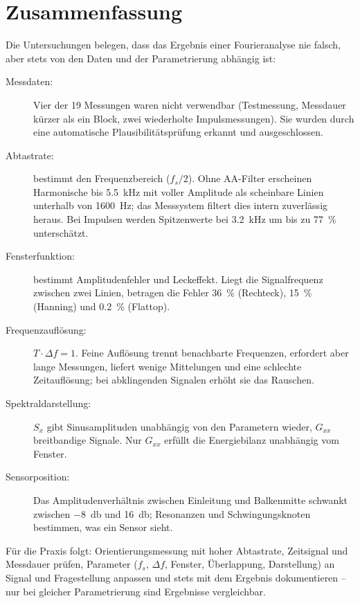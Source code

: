 \documentclass[a4paper,11pt,parskip=half,toc=listof,bibliography=totoc]{scrartcl}
\newcommand{\Sx}{S_{x}}
\newcommand{\Gxx}{G_{xx}}
\begin{document}
\section{Zusammenfassung}
Die Untersuchungen belegen, dass das Ergebnis einer Fourieranalyse nie
\glqq falsch\grqq, aber stets von den Daten und der Parametrierung abhängig
ist:
\begin{description}
  \item[Messdaten:] Vier der 19 Messungen waren nicht verwendbar (Testmessung,
    Messdauer kürzer als ein Block, zwei wiederholte Impulsmessungen). Sie
    wurden durch eine automatische Plausibilitätsprüfung erkannt und
    ausgeschlossen.
  \item[Abtastrate:] bestimmt den Frequenzbereich ($f_s/2$). Ohne
    AA-Filter erscheinen Harmonische bis \SI{5.5}{\kilo\hertz} mit voller
    Amplitude als scheinbare Linien unterhalb von \SI{1600}{\hertz}; das
    Messsystem filtert dies intern zuverlässig heraus. Bei Impulsen werden
    Spitzenwerte bei \SI{3.2}{\kilo\hertz} um bis zu \SI{77}{\percent}
    unterschätzt.
  \item[Fensterfunktion:] bestimmt Amplitudenfehler und Leckeffekt. Liegt die
    Signalfrequenz zwischen zwei Linien, betragen die Fehler
    \SI{36}{\percent} (Rechteck), \SI{15}{\percent} (Hanning) und
    \SI{0.2}{\percent} (Flattop).
  \item[Frequenzauflösung:] $T\cdot\Delta f = 1$. Feine Auflösung trennt
    benachbarte Frequenzen, erfordert aber lange Messungen, liefert wenige
    Mittelungen und eine schlechte Zeitauflösung; bei abklingenden
    Signalen erhöht sie das Rauschen.
  \item[Spektraldarstellung:] $\Sx$ gibt Sinusamplituden unabhängig von den
    Parametern wieder, $\Gxx$ breitbandige Signale. Nur $\Gxx$ erfüllt die
    Energiebilanz unabhängig vom Fenster.
  \item[Sensorposition:] Das Amplitudenverhältnis zwischen Einleitung und
    Balkenmitte schwankt zwischen \SI{-8}{\decibel} und \SI{+16}{\decibel};
    Resonanzen und Schwingungsknoten bestimmen, was ein Sensor
    \glqq sieht\grqq.
\end{description}
Für die Praxis folgt: Orientierungsmessung mit hoher Abtastrate,
Zeitsignal und Messdauer prüfen, Parameter ($f_s$, $\Delta f$, Fenster,
Überlappung, Darstellung) an Signal und Fragestellung anpassen und stets mit
dem Ergebnis dokumentieren -- nur bei gleicher Parametrierung sind Ergebnisse
vergleichbar.
\end{document}
